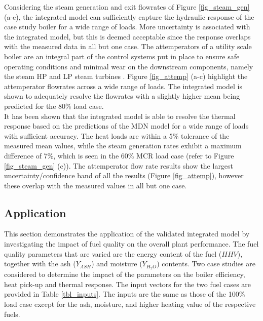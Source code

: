\documentclass[a4paper,fleqn]{cas-sc}
\begin{document}
Considering the steam generation and exit flowrates of Figure \ref{fig_steam_gen} (a-c), the integrated model can sufficiently capture the hydraulic response of the case study boiler for a wide range of loads. More uncertainty is associated with the integrated model, but this is deemed acceptable since the response overlaps with the measured data in all but one case. The attemperators of a utility scale boiler are an integral part of the control systems put in place to ensure safe operating conditions and minimal wear on the downstream components, namely the steam HP and LP steam turbines \cite{Kakac1991}. Figure  \ref{fig_attemp} (a-c) highlight the attemperator flowrates across a wide range of loads. The integrated model is shown to adequately resolve the flowrates with a slightly higher mean being predicted for the 80\% load case.\\

It has been shown that the integrated model is able to resolve the thermal response based on the predictions of the MDN model for a wide range of loads with sufficient accuracy. The heat loads are within a 5\% tolerance of the measured mean values, while the steam generation rates exhibit a maximum difference of 7\%, which is seen in the 60\% MCR load case (refer to Figure \ref{fig_steam_gen} (c)). The attemperator flow rate results show the largest uncertainty/confidence band of all the results (Figure \ref{fig_attemp}), however these overlap with the measured values in all but one case. 
\subsection{Application}
This section demonstrates the application of the validated integrated model by investigating the impact of fuel quality on the overall plant performance. The fuel quality parameters that are varied are the energy content of the fuel ($HHV$), together with the ash ($Y_{ASH}$) and moisture ($Y_{H_{2}O}$) contents. Two case studies are considered to determine the impact of the parameters on the boiler efficiency, heat pick-up and thermal response. The input vectors for the two fuel cases are provided in Table \ref{tbl_inputs}. The inputs are the same as those of the 100\% load case except for the ash, moisture, and higher heating value of the respective fuels.\\
\end{document}
